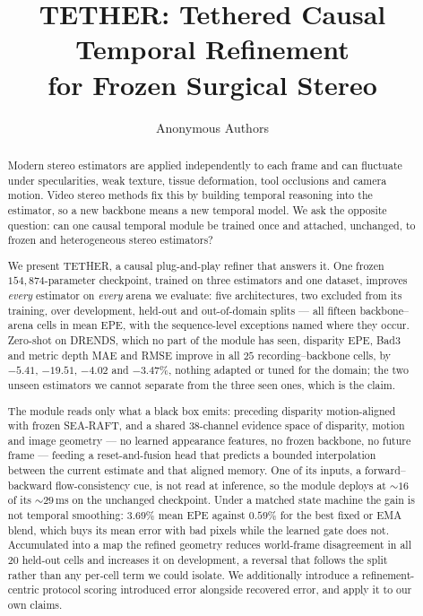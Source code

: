 \documentclass[letterpaper,10pt,conference]{ieeeconf}
\title{
\textbf{TETHER: Tethered Causal Temporal Refinement\\
for Frozen Surgical Stereo}
}
\author{Anonymous Authors}
\newcommand{\steer}{TETHER}
\begin{document}
\maketitle
\thispagestyle{empty}
\pagestyle{empty}

\begin{abstract}

Modern stereo estimators are applied independently to each frame and can
fluctuate under specularities, weak texture, tissue deformation, tool
occlusions and camera motion. Video stereo methods fix this by building
temporal reasoning into the estimator, so a new backbone means a new temporal
model. We ask the opposite question: can one causal temporal module be trained
once and attached, unchanged, to frozen and heterogeneous stereo estimators?

We present \steer, a causal plug-and-play refiner that answers it. One frozen
$154{,}874$-parameter checkpoint, trained on three estimators and one dataset,
improves \emph{every} estimator on \emph{every} arena we evaluate: five
architectures, two excluded from its training, over development, held-out and
out-of-domain splits --- all fifteen backbone--arena cells in mean EPE, with
the sequence-level exceptions named where they occur. Zero-shot on DRENDS,
which no part of the module has seen, disparity EPE, Bad3 and metric depth MAE
and RMSE improve in all $25$ recording--backbone cells, by $-5.41$, $-19.51$,
$-4.02$ and $-3.47\%$, nothing adapted or tuned for the domain; the two unseen
estimators we cannot separate from the three seen ones, which is the claim.

The module reads only what a black box emits: preceding disparity
motion-aligned with frozen SEA-RAFT, and a shared 38-channel evidence space of
disparity, motion and image geometry --- no learned appearance features, no
frozen backbone, no future frame --- feeding a reset-and-fusion head that
predicts a bounded interpolation between the current estimate and that aligned
memory. One of its inputs, a forward--backward flow-consistency cue, is
not read at inference, so the module deploys at ${\sim}16$ of its
${\sim}29$\,ms on the unchanged checkpoint. Under a
matched state machine the gain is not temporal smoothing:
$3.69\%$ mean EPE against $0.59\%$ for the best fixed or EMA blend, which buys
its mean error with bad pixels while the learned gate does not. Accumulated
into a map the refined geometry reduces world-frame disagreement in all $20$
held-out cells and increases it on development, a reversal that follows the
split rather than any per-cell term we could isolate. We additionally introduce a refinement-centric protocol
scoring introduced error alongside recovered error, and apply it to our own
claims.

\end{abstract}
\end{document}
